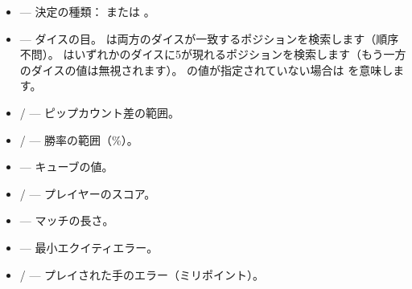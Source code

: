 \documentclass[letterpaper,10pt,dvipdfmx]{sphinxmanual}
\begin{document}
\sphinxAtStartPar
{}
\begin{itemize}
\item {} 
\sphinxAtStartPar
{} — 決定の種類： または 。

\item {} 
\sphinxAtStartPar
{} — ダイスの目。 は両方のダイスが一致するポジションを検索します（順序不問）。 はいずれかのダイスに5が現れるポジションを検索します（もう一方のダイスの値は無視されます）。 の値が指定されていない場合は  を意味します。

\item {} 
\sphinxAtStartPar
{} /  — ピップカウント差の範囲。

\item {} 
\sphinxAtStartPar
{} /  — 勝率の範囲（\%）。

\item {} 
\sphinxAtStartPar
{} — キューブの値。

\item {} 
\sphinxAtStartPar
{} /  — プレイヤーのスコア。

\item {} 
\sphinxAtStartPar
{} — マッチの長さ。

\item {} 
\sphinxAtStartPar
{} — 最小エクイティエラー。

\item {} 
\sphinxAtStartPar
{} /  — プレイされた手のエラー（ミリポイント）。


\end{itemize}
\end{document}
